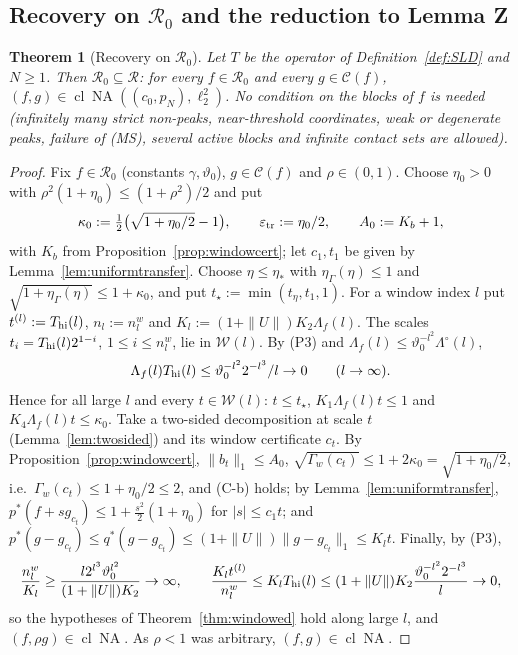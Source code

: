 \documentclass[10pt]{amsart}
\newtheorem{theorem}{Theorem}[section]
\theoremstyle{definition}
\theoremstyle{remark}
\newcommand{\NA}{\operatorname{NA}}
\newcommand{\Cset}{\mathcal C}
\newcommand{\cl}{\operatorname{cl}}
\newcommand{\Rec}{\mathcal R}
\begin{document}
\subsection{Recovery on $\mathcal R_0$ and the reduction to Lemma Z}

\begin{theorem}[Recovery on $\mathcal R_0$]\label{thm:R0}
Let $T$ be the operator of Definition~\ref{def:SLD} and $N\ge1$.  Then
$\mathcal R_0\subseteq\Rec$: for every $f\in\mathcal R_0$ and every
$g\in\Cset(f)$, $(f,g)\in\cl\NA((c_0,p_N),\ell_2^2)$.  No condition on the
blocks of $f$ is needed \textup{(}infinitely many strict non-peaks,
near-threshold coordinates, weak or degenerate peaks, failure of
\textup{(MS)}, several active blocks and infinite contact sets are
allowed\textup{)}.
\end{theorem}

\begin{proof}
Fix $f\in\mathcal R_0$ (constants $\gamma,\vartheta_0$), $g\in\Cset(f)$ and
$\rho\in(0,1)$.  Choose $\eta_0>0$ with $\rho^2(1+\eta_0)\le(1+\rho^2)/2$ and
put
\[
 \kappa_0:=\tfrac12\big(\sqrt{1+\eta_0/2}-1\big),\qquad
 \varepsilon_{\rm tr}:=\eta_0/2,\qquad A_0:=K_b+1,
\]
with $K_b$ from Proposition~\ref{prop:windowcert}; let $c_1,t_1$ be given by
Lemma~\ref{lem:uniformtransfer}.  Choose $\eta\le\eta_*$ with
$\eta_\Gamma(\eta)\le1$ and $\sqrt{1+\eta_\Gamma(\eta)}\le1+\kappa_0$, and put
$t_\star:=\min(t_\eta,t_1,1)$.  For a window index $l$ put $t^{(l)}:=
T_{\rm hi}(l)$, $n_l:=n^w_l$ and $K_l:=(1+\|U\|)K_2\Lambda_f(l)$.  The scales
$t_i=T_{\rm hi}(l)2^{1-i}$, $1\le i\le n^w_l$, lie in $\mathcal W(l)$.  By
(P3) and $\Lambda_f(l)\le\vartheta_0^{-l^2}\Lambda^\circ(l)$,
\[
 \Lambda_f(l)T_{\rm hi}(l)\le\vartheta_0^{-l^2}2^{-l^3}/l\to0\qquad(l\to\infty).
\]
Hence for all large $l$ and every $t\in\mathcal W(l)$: $t\le t_\star$,
$K_1\Lambda_f(l)t\le1$ and $K_4\Lambda_f(l)t\le\kappa_0$.  Take a two-sided
decomposition at scale $t$ (Lemma~\ref{lem:twosided}) and its window
certificate $c_t$.  By Proposition~\ref{prop:windowcert},
$\|b_t\|_1\le A_0$, $\sqrt{\Gamma_w(c_t)}\le1+2\kappa_0=\sqrt{1+\eta_0/2}$,
i.e.\ $\Gamma_w(c_t)\le1+\eta_0/2\le2$, and (C-b) holds; by
Lemma~\ref{lem:uniformtransfer}, $p^*(f+sg_{c_t})\le1+\frac{s^2}2(1+\eta_0)$
for $|s|\le c_1t$; and $p^*(g-g_{c_t})\le q^*(g-g_{c_t})\le(1+\|U\|)
\|g-g_{c_t}\|_1\le K_lt$.  Finally, by (P3),
\[
 \frac{n^w_l}{K_l}\ge\frac{l2^{l^3}\vartheta_0^{l^2}}{(1+\|U\|)K_2}\to\infty,
 \qquad\frac{K_lt^{(l)}}{n^w_l}\le K_lT_{\rm hi}(l)\le(1+\|U\|)K_2
 \frac{\vartheta_0^{-l^2}2^{-l^3}}l\to0,
\]
so the hypotheses of Theorem~\ref{thm:windowed} hold along large $l$, and
$(f,\rho g)\in\cl\NA$.  As $\rho<1$ was arbitrary, $(f,g)\in\cl\NA$.
\end{proof}
\end{document}
